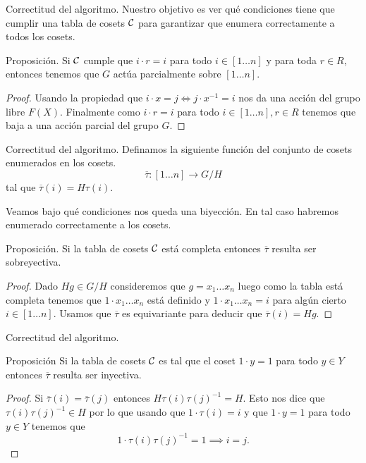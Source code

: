\documentclass[aspectratio=169, 9pt]{beamer}
\newcommand{\In}{[1 \dots n]}
\newcommand{\ol}{\overline}
\newcommand{\Co}{{\cal{C}}}
\begin{document}
\begin{frame}[fragile]{Correctitud del algoritmo.}
	Nuestro objetivo es ver qué condiciones tiene que cumplir una tabla de cosets $\Co$ para garantizar que enumera correctamente a todos los cosets.

	\begin{alertblock}{Proposición.}
		Si $\Co$ cumple que  $i \cdot r = i$ para todo $i \in \In$ y para toda $r \in R$, 
		entonces tenemos que $G$ actúa parcialmente sobre $\In$.
	\end{alertblock}
	\medskip
	
	\begin{proof}
		Usando la propiedad que $i \cdot x = j \iff j\cdot x^{-1} = i$ nos da una acción del grupo libre $F(X)$.
		Finalmente como $i \cdot r = i$ para todo $i \in \In, r \in R$ tenemos que baja a una acción parcial del grupo $G$. 
	\end{proof}
\end{frame}


\begin{frame}[fragile]{Correctitud del algoritmo.}
	Definamos la siguiente función del conjunto de cosets enumerados en los cosets.
	\[
	\ol \tau: \In \to G/H
	\]
	tal que $\ol \tau (i) = H \tau (i)$.
	
	Veamos bajo qué condiciones nos queda una biyección. 
	En tal caso habremos enumerado correctamente a los cosets.
	\medskip
	
	
	
	\begin{alertblock}{Proposición.}
		Si la tabla de cosets $\Co$ está completa entonces $\ol \tau$ resulta ser sobreyectiva.
	\end{alertblock}
	
	
	\begin{proof}
		Dado $Hg \in G/H$ consideremos que $g = x_1 \dots x_n$ luego como la tabla está completa tenemos que $1 \cdot x_1 \dots x_n$ está definido y $1 \cdot x_1 \dots x_n  = i$ para algún cierto $i \in \In$.
		Usamos que $\ol \tau$ es equivariante para deducir que $\ol \tau (i) = Hg$.
	\end{proof}
	
	
	
	
\end{frame}

\begin{frame}[fragile]{Correctitud del algoritmo.}
	\begin{alertblock}{Proposición}
		Si la tabla de cosets $\Co$ es tal que el coset $1 \cdot y = 1$ para todo $y \in Y$ entonces $\ol \tau$ resulta ser inyectiva.
	\end{alertblock}
	
	\begin{proof}
		Si $\ol \tau (i) = \ol \tau (j)$ entonces $H \tau (i) \tau (j)^{-1} = H$.
		Esto nos dice que $\tau (i) \tau(j)^{-1} \in H$ por lo que usando que $ 1 \cdot {\tau(i)} = i$ y que $1 \cdot y = 1$ para todo $y \in Y$ tenemos que 
		\[
		1 \cdot \tau(i)\tau(j)^{-1} = 1 \implies i = j.
		\]   
	\end{proof}
\end{frame}
\end{document}
